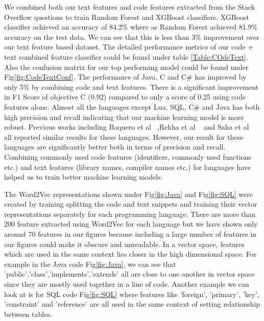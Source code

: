 \documentclass[letterpaper, 10 pt, conference]{ieeeconf}  %
\begin{document}
We combined both our text features and code features extracted from the Stack Overflow questions to train Random Forest and XGBoost classifiers. XGBoost classifier achieved an accuracy of 84.2\% where as Random Forest achieved 81.9\% accuracy on the test data. We can see that this is less than 3\% improvement over our text feature based dataset. The detailed performance metrics of our code + text combined feature classifier could be found under table \ref{Table:COdeText}. Also the confusion matrix for our top performing model could be found under Fig\ref{fig:CodeTextConf}. The performance of Java, C and C\# has improved by only 5\% by combining code and text features. There is a significant improvement in F1 Score of objective C (0.92) compared to only a score of 0.25 using code features alone. Almost all the languages except Lua, SQL, C\# and Java has both high precision and recall indicating that our machine learning model is more robust. Previous works including Baquero et al ~\cite{c18},Rekha et al ~\cite{c10} and Saha et al ~\cite{c1} all reported similar results for these languages. However, our result for these languages are significantly better both in terms of precision and recall. Combining commonly used code features (identifiers, commonly used functions etc.) and text features (library names, compiler names etc.) for languages have helped us to train better machine learning models.

The Word2Vec representations shown under Fig\ref{fig:Java} and Fig\ref{fig:SQL} were created by training splitting the code and text snippets and training their vector representations separately for each programming language. There are more than 200 feature extracted using Word2Vec for each language but we have shown only around 70 features in our figures because including a large number of features in our figures could make it obscure and unreadable. In a vector space, features which are used in the same context lies closer in the high dimensional space. For example in the Java code Fig\ref{fig:Java}, we can see that 'public','class','implements','extends' all are close to one another in vector space since they are mostly used together in a line of code. Another example we can look at is for SQL code Fig\ref{fig:SQL} where features like 'foreign', 'primary', 'key', 'constraint' and 'reference' are all used in the same context of setting relationship between tables. 
\end{document}
